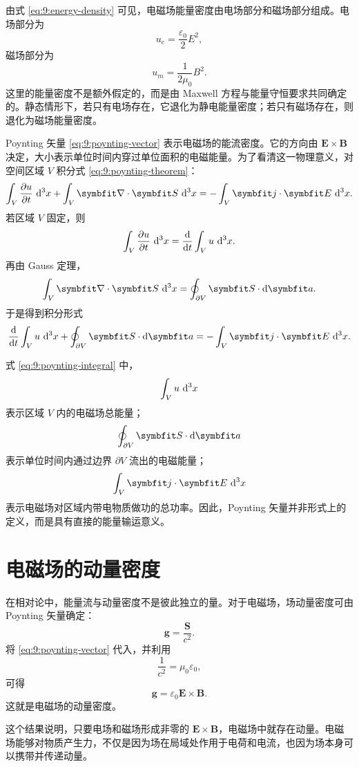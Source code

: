 由式 \eqref{eq:9:energy-density} 可见，电磁场能量密度由电场部分和磁场部分组成。电场部分为
\[
u_{e}=\frac{\varepsilon_{0}}{2}E^{2},
\]
磁场部分为
\[
u_{m}=\frac{1}{2\mu_{0}}B^{2}.
\]
这里的能量密度不是额外假定的，而是由 Maxwell 方程与能量守恒要求共同确定的。静态情形下，若只有电场存在，它退化为静电能量密度；若只有磁场存在，则退化为磁场能量密度。

Poynting 矢量 \eqref{eq:9:poynting-vector} 表示电磁场的能流密度。它的方向由 $\bm{E}\times\bm{B}$ 决定，大小表示单位时间内穿过单位面积的电磁能量。为了看清这一物理意义，对空间区域 $V$ 积分式 \eqref{eq:9:poynting-theorem}：
\[
\int_{V}
\frac{\partial u}{\partial t}\,\dif^{3}x
+
\int_{V}
\bm{\nabla}\cdot\bm{S}\,\dif^{3}x
=
-\int_{V}
\bm{j}\cdot\bm{E}\,\dif^{3}x.
\]
若区域 $V$ 固定，则
\[
\int_{V}
\frac{\partial u}{\partial t}\,\mathop{}\!\mathrm{d}^{3}x
=
\frac{\mathop{}\!\mathrm{d}}{\mathop{}\!\mathrm{d} t}
\int_{V}
u\,\mathop{}\!\mathrm{d}^{3}x.
\]
再由 Gauss 定理，
\[
\int_{V}
\bm{\nabla}\cdot\bm{S}\,\dif^{3}x
=
\oint_{\partial V}
\bm{S}\cdot\dif\bm{a}.
\]
于是得到积分形式
\begin{equation}
	\frac{\dif}{\dif t}
	\int_{V}u\,\dif^{3}x
	+
	\oint_{\partial V}
	\bm{S}\cdot\dif\bm{a}
	=
	-\int_{V}
	\bm{j}\cdot\bm{E}\,\dif^{3}x.
	\label{eq:9:poynting-integral}
\end{equation}

式 \eqref{eq:9:poynting-integral} 中，
\[
\int_{V}u\,\mathop{}\!\mathrm{d}^{3}x
\]
表示区域 $V$ 内的电磁场总能量；
\[
\oint_{\partial V}
\bm{S}\cdot\dif\bm{a}
\]
表示单位时间内通过边界 $\partial V$ 流出的电磁能量；
\[
\int_{V}
\bm{j}\cdot\bm{E}\,\dif^{3}x
\]
表示电磁场对区域内带电物质做功的总功率。因此，Poynting 矢量并非形式上的定义，而是具有直接的能量输运意义。

\section{电磁场的动量密度}

在相对论中，能量流与动量密度不是彼此独立的量。对于电磁场，场动量密度可由 Poynting 矢量确定：
\begin{equation}
	\bm{g}
	=
	\frac{\bm{S}}{c^{2}}.
	\label{eq:9:momentum-density-s}
\end{equation}
将 \eqref{eq:9:poynting-vector} 代入，并利用
\[
\frac{1}{c^{2}}
=
\mu_{0}\varepsilon_{0},
\]
可得
\begin{equation}
	\bm{g}
	=
	\varepsilon_{0}\bm{E}\times\bm{B}.
	\label{eq:9:momentum-density}
\end{equation}
这就是电磁场的动量密度。

这个结果说明，只要电场和磁场形成非零的 $\bm{E}\times\bm{B}$，电磁场中就存在动量。电磁场能够对物质产生力，不仅是因为场在局域处作用于电荷和电流，也因为场本身可以携带并传递动量。

